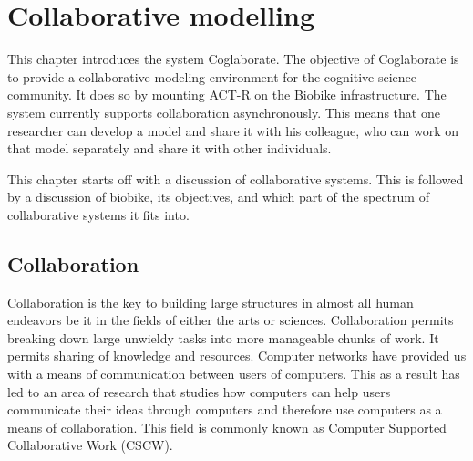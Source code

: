 
\chapter{Collaborative modelling}
\label{chap-four}


This chapter introduces the system Coglaborate.
%
The objective of Coglaborate is to provide a collaborative modeling
environment for the cognitive science community. It does so by
mounting ACT-R on the Biobike infrastructure. The system currently
supports collaboration asynchronously. This means that one researcher
can develop a model and share it with his colleague, who can work on
that model separately and share it with other individuals.


This chapter starts off with a discussion of collaborative
systems. This is followed by a discussion of biobike, its objectives,
and which part of the spectrum of collaborative systems it fits
into.

\section{Collaboration}
Collaboration is the key to building large structures in almost all
human endeavors be it in the fields of either the arts or
sciences. Collaboration permits breaking down large unwieldy tasks
into more manageable chunks of work. It permits sharing of knowledge
and resources. Computer networks have provided us with a means of
communication between users of computers. This as a result has led to
an area of research that studies how computers can help users
communicate their ideas through computers and therefore use computers
as a means of collaboration.  This field is commonly known as Computer
Supported Collaborative Work (CSCW).


